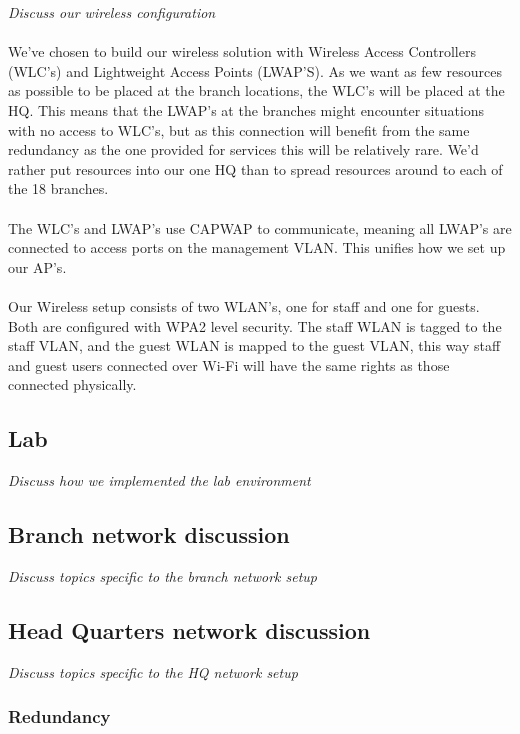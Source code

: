 \textit{Discuss our wireless configuration}
\\
\\
We've chosen to build our wireless solution with Wireless Access Controllers (WLC's) and Lightweight Access Points (LWAP'S). As we want as few resources as possible to be placed at the branch locations, the WLC's will be placed at the HQ. This means that the LWAP's at the branches might encounter situations with no access to WLC's, but as this connection will benefit from the same redundancy as the one provided for services this will be relatively rare. We'd rather put resources into our one HQ than to spread resources around to each of the 18 branches.
\\
\\
The WLC's and LWAP's use CAPWAP to communicate, meaning all LWAP's are connected to access ports on the management VLAN. This unifies how we set up our AP's.
\\
\\
Our Wireless setup consists of two WLAN's, one for staff and one for guests. Both are configured with WPA2 level security. The staff WLAN is tagged to the staff VLAN, and the guest WLAN is mapped to the guest VLAN, this way staff and guest users connected over Wi-Fi will have the same rights as those connected physically.

\subsection{Lab}

\textit{Discuss how we implemented the lab environment}

\subsection{Branch network discussion}

\textit{Discuss topics specific to the branch network setup}

\subsection{Head Quarters network discussion}

\textit{Discuss topics specific to the HQ network setup}

\subsubsection{Redundancy}

